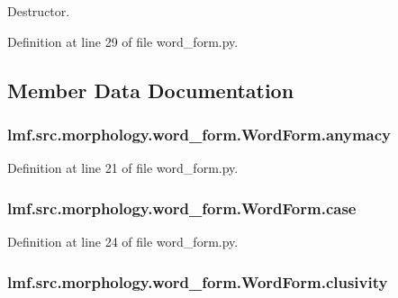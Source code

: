 Destructor. 



Definition at line 29 of file word\+\_\+form.\+py.



\subsection{Member Data Documentation}
\hypertarget{classlmf_1_1src_1_1morphology_1_1word__form_1_1_word_form_aaf6096a08af3e92ad3878b68d2e136d3}{
\subsubsection[{anymacy}]{\setlength{\rightskip}{0pt plus 5cm}lmf.\+src.\+morphology.\+word\+\_\+form.\+Word\+Form.\+anymacy}}\label{classlmf_1_1src_1_1morphology_1_1word__form_1_1_word_form_aaf6096a08af3e92ad3878b68d2e136d3}


Definition at line 21 of file word\+\_\+form.\+py.

\hypertarget{classlmf_1_1src_1_1morphology_1_1word__form_1_1_word_form_ac996cb6a252a2e97aea0ba861982a640}{
\subsubsection[{case}]{\setlength{\rightskip}{0pt plus 5cm}lmf.\+src.\+morphology.\+word\+\_\+form.\+Word\+Form.\+case}}\label{classlmf_1_1src_1_1morphology_1_1word__form_1_1_word_form_ac996cb6a252a2e97aea0ba861982a640}


Definition at line 24 of file word\+\_\+form.\+py.

\hypertarget{classlmf_1_1src_1_1morphology_1_1word__form_1_1_word_form_aafbd3d5422083422a4a9ee9b1379913e}{
\subsubsection[{clusivity}]{\setlength{\rightskip}{0pt plus 5cm}lmf.\+src.\+morphology.\+word\+\_\+form.\+Word\+Form.\+clusivity}}\label{classlmf_1_1src_1_1morphology_1_1word__form_1_1_word_form_aafbd3d5422083422a4a9ee9b1379913e}


